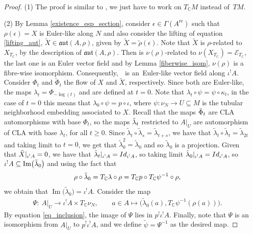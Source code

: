 \documentclass[11pt]{article}
\numberwithin{equation}{section}
\numberwithin{equation}{section}
\newcommand{\C}{{\mathbb{C}}}
\newcommand{\aut}{\mathfrak{aut}}
\DeclareMathOperator{\im}{Im}
\DeclareMathOperator{\real}{re}
\begin{document}
\begin{proof}
(1) The proof is similar to \cite[Theorem 3.13]{bursztyn2019splitting}, we just have to work on $T_{\C}M$ instead of~$TM$.

   (2) By Lemma \ref{existence_esp_section}, consider $\epsilon\in \Gamma(A^{\real})$ such that $\rho(\epsilon)=X$ is Euler-like along $N$ and also consider the lifting of equation \eqref{lifting_aut}, $\widetilde{X}\in \aut(A, \rho)$, given by $\widetilde{X}=\widetilde{\rho}(\epsilon)$.
  Note that $\widetilde{X}$ is $\rho$-related to $X_{T_{\C}}$, by the description of $\aut(A,\rho)$.
   Then  is $\nu(\rho)$-related to $\nu(X_{T_{\C}})=\mathcal{E}_{T_{\C}}$, the last one is an Euler vector field and by Lemma \ref{fiberwise_isom}, $\nu(\rho)$ is a fibre-wise isomorphism. Consequently,~~is an~Euler-like vector field along $\iota^! A$.
   Consider $\Phi_t$ and $\widetilde{\Phi}_t$ the flow of $X$ and $\widetilde{X}$, respectively. Since both are Euler-like, the maps $\lambda_t=\Phi_{-\log(t)}$ and  are defined at $t=0$. Note that $ \lambda_t\circ \psi=\psi\circ \kappa_t$, in the case of $t=0$ this means that $\lambda_0\circ\psi=p\circ \iota$, where $\psi\colon \nu_N\to U\subseteq M$ is the tubular neighborhood embedding associated to $X$. Recall that the maps $\Tilde{\Phi}_t$ are CLA automorphisms with base $\Phi_t$, so the maps $\Tilde{\lambda}_t$ restricted to $A|_U$ are automorphism of CLA with base $\lambda_t$, for all $t\geq 0$.
   Since $\widetilde{\lambda}_t\circ\widetilde{\lambda}_s=\widetilde{\lambda}_{t+s}$, we have that $\widetilde{\lambda}_t\circ\widetilde{\lambda}_t=\widetilde{\lambda}_{2t}$ and taking limit to $t=0$, we get that $\widetilde{\lambda}^2_0=\widetilde{\lambda}_0$ and so $\widetilde{\lambda}_0$ is a projection. Given that $\Tilde{X}|_{\iota^! A}=0$, we have that $\Tilde{\lambda}_t|_{\iota^! A}={\rm Id}_{\iota^! A}$, so taking limit $\Tilde{\lambda}_0|_{\iota^! A}={\rm Id}_{\iota^! A}$, so $\iota^! A\subseteq \im\bigl(\Tilde{\lambda}_0\bigr)$ and using the fact that
  \begin{equation}\label{eq_inclusion}
    \rho\circ \Tilde{\lambda}_0=T_{\C}\lambda\circ \rho=T_{\C}p\circ T_{\C}\psi^{-1}\circ\rho,
  \end{equation}
  we obtain that $\im\bigl(\widetilde{\lambda}_0\bigr)=\iota^! A$. Consider the map
  \begin{align*} \Psi\colon \ A|_U \to \iota^! A\times T_{\C}\nu_N, \qquad
   a\in A \mapsto \bigl(\widetilde{\lambda}_0(a), T_{\C}\psi^{-1}(\rho(a))\bigr).
   \end{align*}
By equation \eqref{eq_inclusion}, the image of $\Psi$ lies in $p^!\iota^! A$. Finally, note that $\Psi$ is an isomorphism from $A|_U$ to $p^!\iota^! A$, and we define $\widetilde{\psi}=\Psi^{-1}$ as the desired map.
\end{proof}
\end{document}
